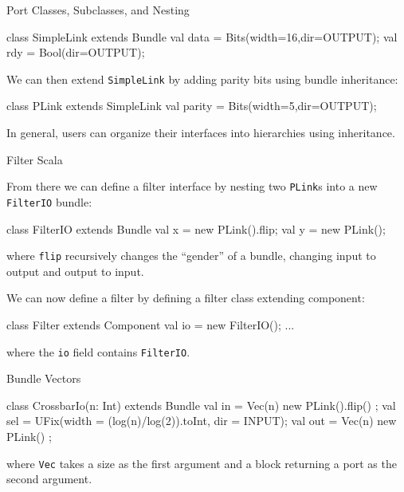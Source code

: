 \documentclass[xcolor=pdflatex,dvipsnames,table]{beamer}
\begin{document}
\begin{frame}[fragile]{Port Classes, Subclasses, and Nesting}

\begin{scala}
class SimpleLink extends Bundle { 
  val data = Bits(width=16,dir=OUTPUT); 
  val rdy  = Bool(dir=OUTPUT);
}
\end{scala}

\noindent
We can then extend \verb+SimpleLink+ by adding parity bits using
bundle inheritance:

\begin{scala}
class PLink extends SimpleLink { 
  val parity = Bits(width=5,dir=OUTPUT); 
}
\end{scala}

\noindent
In general, users can organize their interfaces into hierarchies using inheritance.  

\end{frame}

\begin{frame}{Filter Scala}

From there we can define a filter interface by nesting two
\verb+PLink+s into a new \verb+FilterIO+ bundle:

\begin{scala}
class FilterIO extends Bundle { 
  val x = new PLink().flip;
  val y = new PLink();
}
\end{scala}

\noindent
where \verb+flip+ recursively changes the ``gender'' of a bundle,
changing input to output and output to input.

We can now define a filter by defining a filter class extending component:

\begin{scala}
class Filter extends Component { 
  val io = new FilterIO();
  ...
}
\end{scala}

\noindent 
where the \verb+io+ field contains \verb+FilterIO+. 

\end{frame}

\begin{frame}[fragile]{Bundle Vectors}

\begin{scala}
class CrossbarIo(n: Int) extends Bundle {
  val in  = Vec(n){ new PLink().flip() };
  val sel = UFix(width = (log(n)/log(2)).toInt, dir = INPUT);
  val out = Vec(n){ new PLink() };
}
\end{scala}

\noindent
where \verb+Vec+ takes a size as the first argument and a block returning a port as the second argument.

\end{frame}
\end{document}
